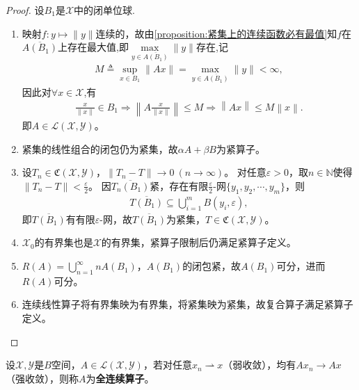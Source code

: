 \documentclass[../../main.tex]{subfiles}%
\begin{document}
\begin{proof}
设$B_1$是$\mathscr{X}$中的闭单位球.
\begin{enumerate}[(1)]
\item 映射$f:y\mapsto\|y\|$连续的，故由\cref{proposition:紧集上的连续函数必有最值}知$f$在$\overline{A(B_1)}$上存在最大值,即$\max\limits_{y\in\overline{A(B_1)}}\|y\|$存在,记
\begin{align*}
M\triangleq\sup\limits_{x\in B_1}\|Ax\|=\max\limits_{y\in\overline{A(B_1)}}\|y\|<\infty,
\end{align*}
因此对$\forall x\in \mathscr{X}$,有
\begin{align*}
\frac{x}{\left\| x \right\|}\in B_1\Longrightarrow \left\| A\frac{x}{\left\| x \right\|} \right\| \leqslant M\Longrightarrow \left\| Ax \right\| \leqslant M\left\| x \right\| .
\end{align*}
即$A\in\mathscr{L}(\mathscr{X},\mathscr{Y})$。

\item 紧集的线性组合的闭包仍为紧集，故$\alpha A+\beta B$为紧算子。

\item 设$T_n\in\mathfrak{C}(\mathscr{X},\mathscr{Y})$，$\|T_n-T\|\to0\ (n\to\infty)$。
对任意$\varepsilon>0$，取$n\in\mathbb{N}$使得$\|T_n-T\|<\frac{\varepsilon}{2}$。
因$\overline{T_n(B_1)}$紧，存在有限$\frac{\varepsilon}{2}$-网$\{y_1,y_2,\cdots,y_m\}$，则
\begin{align*}
\overline{T(B_1)}\subseteq\bigcup\limits_{i=1}^{m}B(y_i,\varepsilon),
\end{align*}
即$\overline{T(B_1)}$有有限$\varepsilon$-网，故$\overline{T(B_1)}$为紧集，$T\in\mathfrak{C}(\mathscr{X},\mathscr{Y})$。

\item $\mathscr{X}_0$的有界集也是$\mathscr{X}$的有界集，紧算子限制后仍满足紧算子定义。

\item $R(A)=\bigcup\limits_{n=1}^{\infty}nA(B_1)$，$A(B_1)$的闭包紧，故$A(B_1)$可分，进而$R(A)$可分。

\item 连续线性算子将有界集映为有界集，将紧集映为紧集，故复合算子满足紧算子定义。
\end{enumerate}
\end{proof}

\begin{definition}[全连续算子]
设$\mathscr{X},\mathscr{Y}$是$B$空间，$A\in\mathscr{L}(\mathscr{X},\mathscr{Y})$，若对任意$x_n\rightharpoonup x$（弱收敛），均有$Ax_n\to Ax$（强收敛），则称$A$为\textbf{全连续算子}。
\end{definition}
\end{document}
